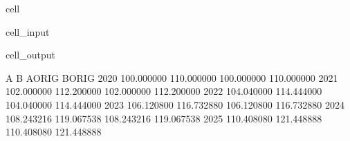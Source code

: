 \documentclass[letterpaper,10pt,english]{jupyterBook}
\begin{document}
\begin{sphinxuseclass}{cell}\begin{sphinxVerbatimInput}

\begin{sphinxuseclass}{cell_input}
\begin{sphinxVerbatim}[commandchars=\\\{\}]
  
       \PYG{p}{[}    \PYG{p}{]} 
       \PYG{p}{[}\PYG{p}{]} 

\PYG{p}{[}\PYG{p}{]}\PYG{p}{[}\PYG{p}{]}
\PYG{p}{[}\PYG{p}{]}\PYG{p}{[}\PYG{p}{]}
\end{sphinxVerbatim}

\end{sphinxuseclass}\end{sphinxVerbatimInput}
\begin{sphinxVerbatimOutput}

\begin{sphinxuseclass}{cell_output}
\begin{sphinxVerbatim}[commandchars=\\\{\}]
               A           B      A\PYGZus{}ORIG      B\PYGZus{}ORIG
2020  100.000000  110.000000  100.000000  110.000000
2021  102.000000  112.200000  102.000000  112.200000
2022  104.040000  114.444000  104.040000  114.444000
2023  106.120800  116.732880  106.120800  116.732880
2024  108.243216  119.067538  108.243216  119.067538
2025  110.408080  121.448888  110.408080  121.448888
\end{sphinxVerbatim}

\end{sphinxuseclass}\end{sphinxVerbatimOutput}

\end{sphinxuseclass}
\end{document}
